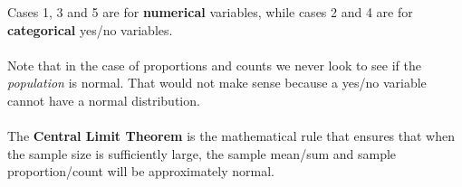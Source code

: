 \noindent Cases 1, 3 and 5 are for \textbf{numerical} variables, while cases 2 and 4 are for \textbf{categorical} yes/no variables.  
\\
\\Note that in the case of proportions and counts we never look to see if the \emph{population} is normal.  That would not make sense because a yes/no variable cannot have a normal distribution.  
\\
\\The \textbf{Central Limit Theorem} is the mathematical rule that ensures that when the sample size is sufficiently large, the sample mean/sum and sample proportion/count will be approximately normal.  
